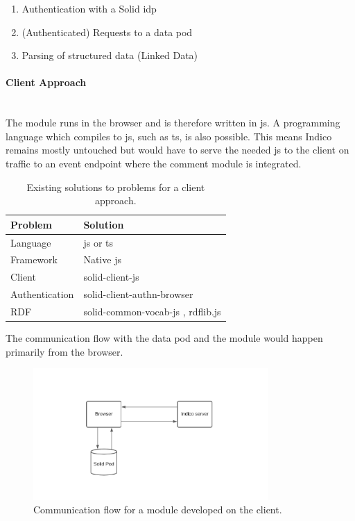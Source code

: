\begin{enumerate}
    \item Authentication with a Solid \gls{idp}
    \item (Authenticated) Requests to a data pod
    \item Parsing of structured data (Linked Data)
\end{enumerate}

\paragraph{Client Approach}\mbox{}\\

The module runs in the browser and is therefore written in \gls{js}. A programming language which compiles to \gls{js}, such as \gls{ts}, is also possible. This means Indico remains mostly untouched but would have to serve the needed \gls{js} to the client on traffic to an event endpoint where the comment module is integrated.

\begin{table}[h!]
    \centering
    \begin{tabular}{| l | l |} 
     \hline
     Problem & Solution \\
     \hline
      Language & \gls{js} or \gls{ts}  \\
      Framework & Native \gls{js}  \\
      Client & solid-client-js \cite{solid-client-js}  \\
      Authentication & solid-client-authn-browser \cite{solid-client-authn-browser} \\
      RDF & solid-common-vocab-js \cite{solid-common-vocab-js}, rdflib.js \cite{rdflib.js}  \\
     \hline
    \end{tabular}
    \vspace{0.75cm}
    \caption{Existing solutions to problems for a client approach.}
    \label{table:1}
\end{table}

The communication flow with the data pod and the module would happen primarily from the browser.

\begin{figure}[H]
    \centering
    \includegraphics[width=0.8\textwidth]{prototype/graphs/poc-infrastructure-frontend.jpeg}
    \caption{Communication flow for a module developed on the client.}
    \label{fig:poc-infrastructure-frontend}
\end{figure}

